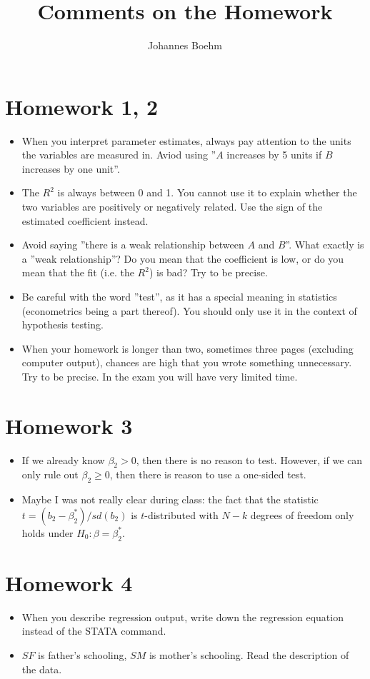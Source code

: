 \documentclass{article}
\title{Comments on the Homework}
\author{Johannes Boehm}
\begin{document}
\maketitle

\section{Homework 1, 2}
\begin{itemize}
\item When you interpret parameter estimates, always pay attention to the units the variables are measured in. Aviod using ''$A$ increases by 5 units if $B$ increases by one unit''.
\item The $R^2$ is always between 0 and 1. You cannot use it to explain whether the two variables are positively or negatively related. Use the sign of the estimated coefficient instead.
\item Avoid saying ''there is a weak relationship between $A$ and $B$''. What exactly is a ''weak relationship''? Do you mean that the coefficient is low, or do you mean that the fit (i.e. the $R^2$) is bad? Try to be precise.
\item Be careful with the word ''test'', as it has a special meaning in statistics (econometrics being a part thereof). You should only use it in the context of hypothesis testing.
\item When your homework is longer than two, sometimes three pages (excluding computer output), chances are high that you wrote something unnecessary. Try to be precise. In the exam you will have very limited time.
\end{itemize}

\section{Homework 3}
\begin{itemize}
\item If we already know $\beta_2 > 0$, then there is no reason to test. However, if we can only rule out $\beta_2 \geq 0$, then there is reason to use a one-sided test.
\item Maybe I was not really clear during class: the fact that the statistic $t=(b_2 - \beta_2^* )/sd(b_2)$ is $t$-distributed with $N-k$ degrees of freedom only holds under $H_0: \beta = \beta_2^* $.
\end{itemize}

\section{Homework 4}
\begin{itemize}
\item When you describe regression output, write down the regression equation instead of the STATA command.
\item $SF$ is father's schooling, $SM$ is mother's schooling. Read the description of the data.
\end{itemize}
\end{document}
